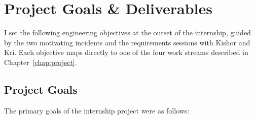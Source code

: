 
\chapter{Project Goals \& Deliverables}
\label{chap:project_goals}

I set the following engineering objectives at the outset of the internship,
guided by the two motivating incidents and the requirements sessions with
Kishor and Kri. Each objective maps directly to one of the four work streams
described in Chapter~\ref{chap:project}.

\section{Project Goals}
\label{sec:project_goals}

The primary goals of the internship project were as follows:


